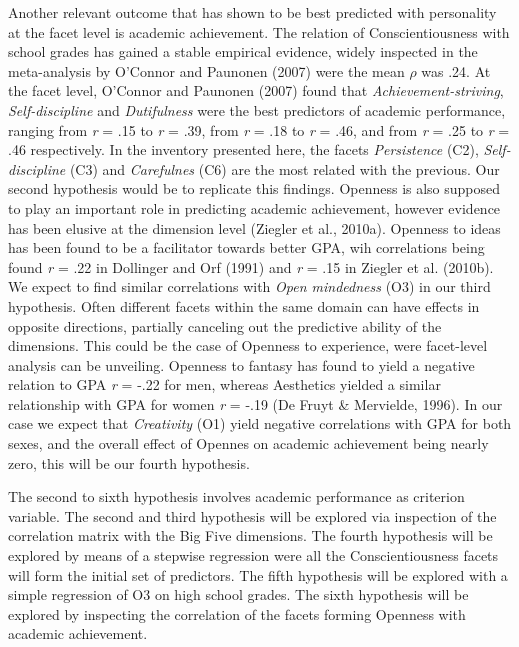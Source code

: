 \documentclass[,man,floatsintext]{apa6}
\theoremstyle{definition}
\theoremstyle{definition}
\theoremstyle{definition}
\theoremstyle{remark}
\begin{document}
Another relevant outcome that has shown to be best predicted with
personality at the facet level is academic achievement. The relation of
Conscientiousness with school grades has gained a stable empirical
evidence, widely inspected in the meta-analysis by O'Connor and Paunonen
(2007) were the mean \(\rho\) was .24. At the facet level, O'Connor and
Paunonen (2007) found that \emph{Achievement-striving},
\emph{Self-discipline} and \emph{Dutifulness} were the best predictors
of academic performance, ranging from \emph{r} = .15 to \emph{r} = .39,
from \emph{r} = .18 to \emph{r} = .46, and from \emph{r} = .25 to
\emph{r} = .46 respectively. In the inventory presented here, the facets
\emph{Persistence} (C2), \emph{Self-discipline} (C3) and
\emph{Carefulnes} (C6) are the most related with the previous. Our
second hypothesis would be to replicate this findings. Openness is also
supposed to play an important role in predicting academic achievement,
however evidence has been elusive at the dimension level (Ziegler et
al., 2010a). Openness to ideas has been found to be a facilitator
towards better GPA, wih correlations being found \emph{r} = .22 in
Dollinger and Orf (1991) and \emph{r} = .15 in Ziegler et al. (2010b).
We expect to find similar correlations with \emph{Open mindedness} (O3)
in our third hypothesis. Often different facets within the same domain
can have effects in opposite directions, partially canceling out the
predictive ability of the dimensions. This could be the case of Openness
to experience, were facet-level analysis can be unveiling. Openness to
fantasy has found to yield a negative relation to GPA \emph{r} = -.22
for men, whereas Aesthetics yielded a similar relationship with GPA for
women \emph{r} = -.19 (De Fruyt \& Mervielde, 1996). In our case we
expect that \emph{Creativity} (O1) yield negative correlations with GPA
for both sexes, and the overall effect of Opennes on academic
achievement being nearly zero, this will be our fourth hypothesis.

The second to sixth hypothesis involves academic performance as
criterion variable. The second and third hypothesis will be explored via
inspection of the correlation matrix with the Big Five dimensions. The
fourth hypothesis will be explored by means of a stepwise regression
were all the Conscientiousness facets will form the initial set of
predictors. The fifth hypothesis will be explored with a simple
regression of O3 on high school grades. The sixth hypothesis will be
explored by inspecting the correlation of the facets forming Openness
with academic achievement.
\end{document}
